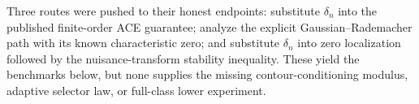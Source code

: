 Three routes were pushed to their honest endpoints: substitute \(\delta_n\) into the published finite-order ACE guarantee; analyze the explicit Gaussian--Rademacher path with its known characteristic zero; and substitute \(\delta_n\) into zero localization followed by the nuisance-transform stability inequality. These yield the benchmarks below, but none supplies the missing contour-conditioning modulus, adaptive selector law, or full-class lower experiment.